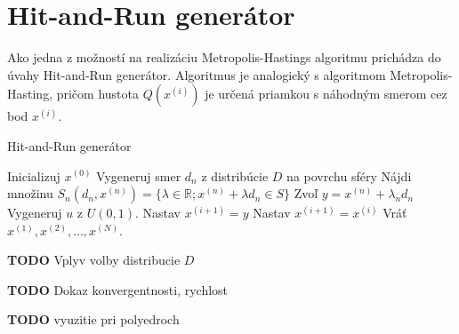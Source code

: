 \section{Hit-and-Run generátor}

Ako jedna z možností na realizáciu Metropolis-Hastings algoritmu prichádza do úvahy Hit-and-Run generátor. Algoritmus je analogický s algoritmom Metropolis-Hasting, pričom hustota $Q(x^{(i)})$ je určená priamkou s náhodným smerom cez bod $x^{(i)}$.

\begin{algorithm}[H]
	\caption{Hit-and-Run generátor \cite{hit-and-run_chen}}
	\label{hit-and-run}
	\begin{algorithmic}[1]
		\State Inicializuj $x^{(0)}$
			\State Vygeneruj smer $d_n$ z distribúcie $D$ na povrchu sféry
			\State Nájdi množinu $S_n(d_n,x^{(n)})=\{\lambda \in \mathbb{R}; x^{(n)} + \lambda d_n \in S \} $
			\State Zvoľ $y=x^{(n)}+\lambda_n d_n$
			\State Vygeneruj $u$ z $U(0,1)$.
				\State Nastav $x^{(i+1)}=y$
			\Else
				\State Nastav $x^{(i+1)}=x^{(i)}$
			\EndIf
		\EndFor
		\State Vráť $x^{(1)},x^{(2)},\dots,x^{(N)}$.
	\end{algorithmic}
\end{algorithm}

\textbf{TODO} Vplyv volby distribucie $D$

\textbf{TODO} Dokaz konvergentnosti, rychlost \cite{hit-and-run_chen}

\textbf{TODO} vyuzitie pri polyedroch
